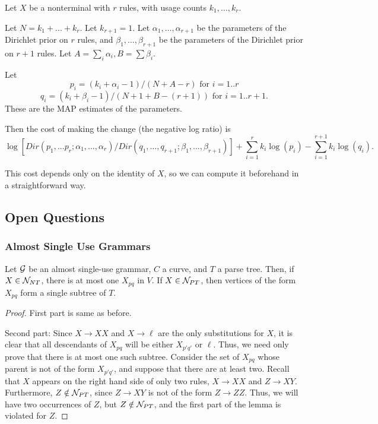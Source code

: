 \documentclass{article}
\begin{document}
Let $X$ be a nonterminal with $r$ rules, with usage counts $k_1, \dots,
k_r$.

Let $N = k_1 + ... + k_r$.  Let $k_{r+1} = 1$.  Let $\alpha_1, \dots,
\alpha_{r+1}$ be the parameters of the Dirichlet prior on $r$ rules,
and $\beta_1, \dots, \beta_{r+1}$ be the parameters of the Dirichlet
prior on $r+1$ rules. Let $A = \sum_i \alpha_i, B = \sum \beta_i$.

Let
$$p_i =  (k_i + \alpha_i -1) / ( N + A -r) \mbox{ for } i=1..r$$
$$q_i = (k_i + \beta_i -1) / ( N+1 + B -(r+1)) \mbox{ for } i=1..r+1.$$
These are the MAP estimates of the parameters. 

Then the cost of making the change (the negative log ratio) is
$$\log \left[ Dir(p_1,...p_r; \alpha_1,...,\alpha_r) /
Dir(q_1,...,q_{r+1}; \beta_1,...,\beta_{r+1}) \right] +
\sum_{i=1}^r k_i \log(p_i) - \sum_{i=1}^{r+1} k_i \log(q_i).$$

This cost depends only on the identity of $X$, so we can compute it
beforehand in a straightforward way.

\subsection{Open Questions}

\subsubsection{Almost Single Use Grammars}


\begin{lem}
Let ${\mathcal G}$ be an almost single-use grammar, $C$ a curve, and $T$ a
parse tree. Then, if $X\in {\mathcal N}_{NT}$, there is at most one $X_{pq}$
in $V$. If $X\in {\mathcal N}_{PT}$, then vertices of the form $X_{pq}$ form a
single subtree of $T$.
\end{lem}
\begin{proof}
First part is same as before.

Second part: Since $X\to XX$ and $X\to \ell$ are the only
substitutions for $X$, it is clear that all descendants of $X_{pq}$
will be either $X_{p'q'}$ or $\ell$. Thus, we need only prove that
there is at most one such subtree. Consider the set of $X_{pq}$ whose
parent is not of the form $X_{p'q'}$, and suppose that there are at
least two. Recall that $X$ appears on the right hand side of only two
rules, $X\to XX$ and $Z\to XY$. Furthermore, $Z\notin {\mathcal N}_{PT}$, since
$Z\to XY$ is not of the form $Z\to ZZ$. Thus, we will have two
occurrences of $Z$, but $Z\notin {\mathcal N}_{PT}$, and the first part of the
lemma is violated for $Z$.
\end{proof}
\end{document}
